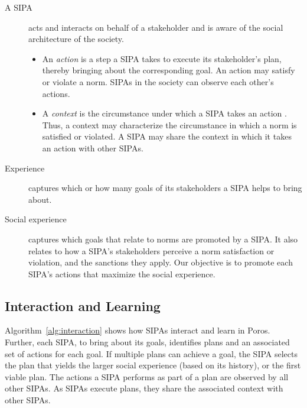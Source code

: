 \documentclass[11pt,          %
               phd,           %
               onehalfspacing %
               ]{ncsuthesis}
\newcommand{\frameworkB}{Poros\xspace}
\newcommand{\nsa}[1]{\textcolor{green!50!black}{NSA:~~#1}}
\newcommand{\mps}[1]{\textcolor{blue}{MPS:~~#1}}
\begin{document}
\begin{description}
\item[A SIPA] acts and interacts on behalf of a stakeholder and
is aware of the social architecture of the society.

\begin{itemize}[nosep]
  \item An \emph{action} is a step a SIPA takes to execute its
    stakeholder's plan, thereby bringing about the corresponding goal.
    An action may satisfy or violate a norm. SIPAs in the society can
    observe each other's actions. 
  \item A \emph{context} is the circumstance under which a SIPA takes
    an action \citep{Dey-2001-Context}. Thus, a context may characterize the circumstance in
    which a norm is satisfied or violated. A SIPA may share the
    context in which it takes an action with other SIPAs.
\end{itemize}

\item[Experience] captures which or how many goals of its stakeholders a SIPA helps to bring about. %

\item[Social experience] captures which goals that relate to norms are promoted by a SIPA. 
It also relates to how a SIPA's stakeholders perceive a
norm satisfaction or violation, and the sanctions they apply. Our
objective is to promote each SIPA's actions that maximize the
social experience. %
\end{description}

\subsection{Interaction and Learning}


Algorithm~\ref{alg:interaction} shows how SIPAs interact and learn in
\frameworkB. Further, each SIPA, to bring about its goals, identifies
plans and an associated set of actions for each goal. If multiple plans
can achieve a goal, the SIPA selects the plan that yields the larger
social experience (based on its history), or the first viable plan. The
actions a SIPA performs as part of a plan are observed by all other
SIPAs. As SIPAs execute plans, they share the associated context with
other SIPAs.
\end{document}
